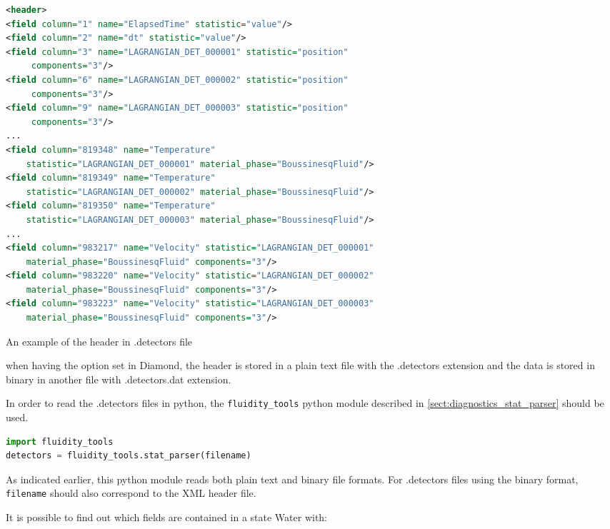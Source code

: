 \begin{example}
\begin{lstlisting}[language = XML]
<header>
<field column="1" name="ElapsedTime" statistic="value"/>
<field column="2" name="dt" statistic="value"/>
<field column="3" name="LAGRANGIAN_DET_000001" statistic="position" 
     components="3"/>
<field column="6" name="LAGRANGIAN_DET_000002" statistic="position" 
     components="3"/>
<field column="9" name="LAGRANGIAN_DET_000003" statistic="position" 
     components="3"/>
...
<field column="819348" name="Temperature" 
    statistic="LAGRANGIAN_DET_000001" material_phase="BoussinesqFluid"/>
<field column="819349" name="Temperature" 
    statistic="LAGRANGIAN_DET_000002" material_phase="BoussinesqFluid"/>
<field column="819350" name="Temperature" 
    statistic="LAGRANGIAN_DET_000003" material_phase="BoussinesqFluid"/>
...
<field column="983217" name="Velocity" statistic="LAGRANGIAN_DET_000001" 
    material_phase="BoussinesqFluid" components="3"/>
<field column="983220" name="Velocity" statistic="LAGRANGIAN_DET_000002" 
    material_phase="BoussinesqFluid" components="3"/>
<field column="983223" name="Velocity" statistic="LAGRANGIAN_DET_000003" 
    material_phase="BoussinesqFluid" components="3"/>
\end{lstlisting}

\caption{An example of the header in .detectors file}
\label{header_det}
\end{example}

when having the  option set in Diamond, the header is stored in a plain text file with the .detectors extension and the data is stored in binary in another file with .detectors.dat extension.

In order to read the .detectors files in python, the \lstinline[language = Python]*fluidity_tools* python module described in \ref{sect:diagnostics_stat_parser} should be used.

\begin{lstlisting}[language = Python]
import fluidity_tools
detectors = fluidity_tools.stat_parser(filename)
\end{lstlisting}

As indicated earlier, this python module reads both
plain text and binary file formats. For .detectors files using the binary
format, \lstinline[language = Python]*filename* should also correspond to the XML header file.

It is possible to find out which fields are contained in a state Water with:

